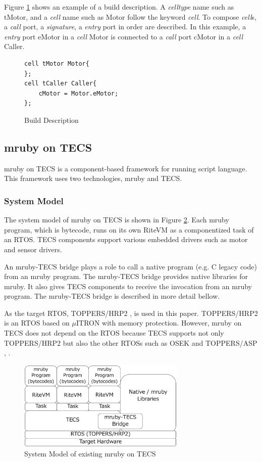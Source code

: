 \documentclass{sig-alternate-05-2015}
\begin{document}
\begin{description}
        Figure \ref{build} shows an example of a build description.
        A {\it celltype} name such as tMotor, and a {\it cell} name such as Motor follow the keyword {\it cell}.
        To compose {\it cell}s, a {\it call} port, a {\it signature}, a {\it entry} port in order are described.
        In this example, a {\it entry} port eMotor in a {\it cell} Motor is connected to a {\it call} port cMotor in a {\it cell} Caller.
\begin{figure}[t]
\centering
\begin{lstlisting}
cell tMotor Motor{
};
cell tCaller Caller{
    cMotor = Motor.eMotor;
};
\end{lstlisting}
\caption{Build Description}
\label{build}
\end{figure}

\end{description}

\subsection{mruby on TECS}
\label{sec:mruby on TECS}
mruby on TECS is a component-based framework for running script language.
This framework uses two technologies, mruby and TECS.

\subsubsection{System Model}
The system model of mruby on TECS is shown in Figure \ref{fig:mrubyontecs}.
Each mruby program, which is bytecode, runs on its own RiteVM as a componentized task of an RTOS.
TECS components support various embedded drivers such as motor and sensor drivers.

An mruby-TECS bridge plays a role to call a native program (e.g. C legacy code) from an mruby program.
The mruby-TECS bridge provides native libraries for mruby.
It also gives TECS components to receive the invocation from an mruby program.
The mruby-TECS bridge is described in more detail bellow.

As the target RTOS, TOPPERS/HRP2 \cite{url:HRP2}, \cite{par:hr-tecs} is used in this paper.
TOPPERS/HRP2 is an RTOS based on $\mu$ITRON \cite{par:microITRON} with memory protection.
However, mruby on TECS does not depend on the RTOS because TECS supports not only TOPPERS/HRP2 but also the other RTOSs such as OSEK \cite{par:OSEK} and TOPPERS/ASP \cite{par:ASP}, \cite{url:ASP}.

\begin{figure}[t]
    \centering
    \includegraphics[width=8cm,clip]{figure/mrubyontecs.eps}
    \caption{System Model of existing mruby on TECS}
    \label{fig:mrubyontecs}
\end{figure}
\end{document}
